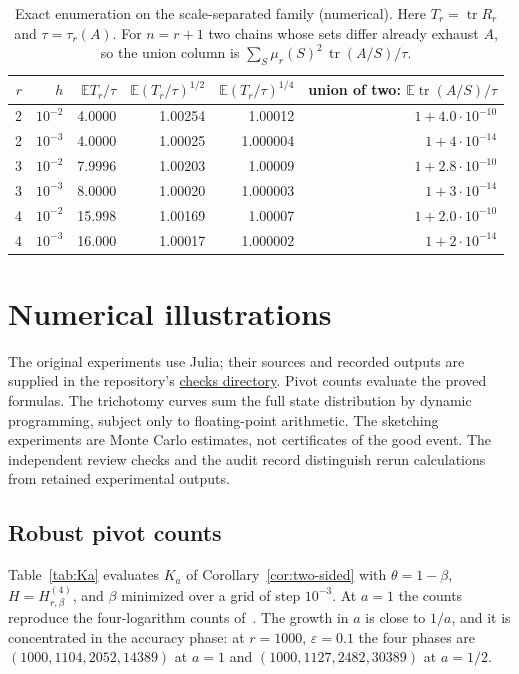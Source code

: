 \documentclass[11pt]{article}
\theoremstyle{definition}\newtheorem{definition}[theorem]{Definition}
\theoremstyle{remark}\newtheorem{remark}[theorem]{Remark}
\newcommand{\E}{\mathbb E}
\newcommand{\eps}{\varepsilon}
\newcommand{\tr}{\operatorname{tr}}
\newcommand{\1}{\mathbf 1}
\begin{document}
\begin{table}[ht]
\centering
\begin{tabular}{rrrrrr}
\toprule
$r$ & $h$ & $\E T_r/\tau$ & $\E(T_r/\tau)^{1/2}$ & $\E(T_r/\tau)^{1/4}$ & union of two: $\E\tr(A/S)/\tau$\\
\midrule
2 & $10^{-2}$ & 4.0000 & 1.00254 & 1.00012 & $1+4.0\cdot10^{-10}$\\
2 & $10^{-3}$ & 4.0000 & 1.00025 & 1.000004 & $1+4\cdot10^{-14}$\\
3 & $10^{-2}$ & 7.9996 & 1.00203 & 1.00009 & $1+2.8\cdot10^{-10}$\\
3 & $10^{-3}$ & 8.0000 & 1.00020 & 1.000003 & $1+3\cdot10^{-14}$\\
4 & $10^{-2}$ & 15.998 & 1.00169 & 1.00007 & $1+2.0\cdot10^{-10}$\\
4 & $10^{-3}$ & 16.000 & 1.00017 & 1.000002 & $1+2\cdot10^{-14}$\\
\bottomrule
\end{tabular}
\caption{Exact enumeration on the scale-separated family (numerical).
Here $T_r=\tr R_r$ and $\tau=\tau_r(A)$. For $n=r+1$ two chains whose
sets differ already exhaust $A$, so the union column is
$\sum_S\mu_r(S)^2\,\tr(A/S)/\tau$.}
\label{tab:det01}
\end{table}
\section{Numerical illustrations}\label{sec:numerics}
The original experiments use Julia; their sources and recorded outputs
are supplied in the repository's \href{https://github.com/DiarHaidary/Results/tree/main/manuscripts/06-Robust-Sketched-RPCholesky/checks}{checks directory}.
Pivot counts evaluate the proved formulas. The trichotomy curves sum
the full state distribution by dynamic programming, subject only to
floating-point arithmetic. The sketching experiments are Monte Carlo
estimates, not certificates of the good event. The independent review
checks and the audit record distinguish rerun calculations from retained
experimental outputs.

\subsection{Robust pivot counts}
Table~\ref{tab:Ka} evaluates $K_a$ of Corollary~\ref{cor:two-sided}
with $\theta=1-\beta$, $H=H^{(4)}_{r,\beta}$, and $\beta$ minimized over a
grid of step $10^{-3}$. At $a=1$ the counts reproduce the four-logarithm
counts of~\cite{RA01}. The growth in $a$ is close to $1/a$, and it is
concentrated in the accuracy phase: at $r=1000$, $\eps=0.1$ the four
phases are $(1000,1104,2052,14389)$ at $a=1$ and
$(1000,1127,2482,30389)$ at $a=1/2$.
\end{document}

